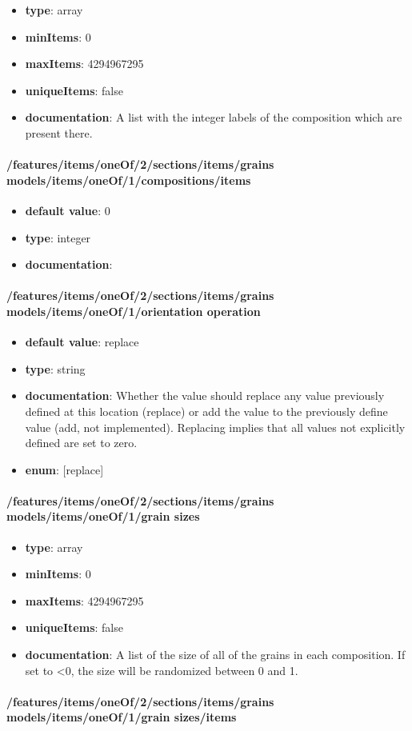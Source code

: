 \begin{itemize}\item {\bf type}: array
\item {\bf minItems}: 0
\item {\bf maxItems}: 4294967295
\item {\bf uniqueItems}: false
\item {\bf documentation}: A list with the integer labels of the composition which are present there.
\end{itemize}\paragraph{/features/items/oneOf/2/sections/items/grains models/items/oneOf/1/compositions/items}
\begin{itemize}\item {\bf default value}: 0
\item {\bf type}: integer
\item {\bf documentation}: 
\end{itemize}\paragraph{/features/items/oneOf/2/sections/items/grains models/items/oneOf/1/orientation operation}
\begin{itemize}\item {\bf default value}: replace
\item {\bf type}: string
\item {\bf documentation}: Whether the value should replace any value previously defined at this location (replace) or add the value to the previously define value (add, not implemented). Replacing implies that all values not explicitly defined are set to zero.
\item {\bf enum}: [replace]\end{itemize}\paragraph{/features/items/oneOf/2/sections/items/grains models/items/oneOf/1/grain sizes}
\begin{itemize}\item {\bf type}: array
\item {\bf minItems}: 0
\item {\bf maxItems}: 4294967295
\item {\bf uniqueItems}: false
\item {\bf documentation}: A list of the size of all of the grains in each composition. If set to <0, the size will be randomized between 0 and 1.
\end{itemize}\paragraph{/features/items/oneOf/2/sections/items/grains models/items/oneOf/1/grain sizes/items}
